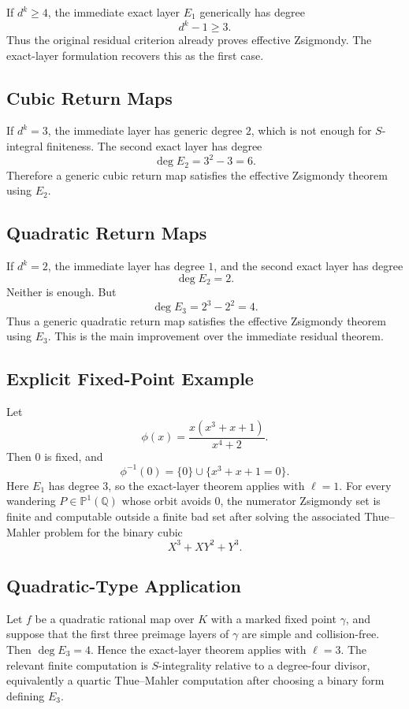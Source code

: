 \documentclass[11pt]{article}
\begin{document}
If \(d^k\ge4\), the immediate exact layer \(E_1\) generically has degree
\[
d^k-1\ge3.
\]
Thus the original residual criterion already proves effective Zsigmondy. The exact-layer formulation recovers this as the first case.

\subsection{Cubic Return Maps}

If \(d^k=3\), the immediate layer has generic degree \(2\), which is not enough for \(S\)-integral finiteness. The second exact layer has degree
\[
\deg E_2=3^2-3=6.
\]
Therefore a generic cubic return map satisfies the effective Zsigmondy theorem using \(E_2\).

\subsection{Quadratic Return Maps}

If \(d^k=2\), the immediate layer has degree \(1\), and the second exact layer has degree
\[
\deg E_2=2.
\]
Neither is enough. But
\[
\deg E_3=2^3-2^2=4.
\]
Thus a generic quadratic return map satisfies the effective Zsigmondy theorem using \(E_3\). This is the main improvement over the immediate residual theorem.

\subsection{Explicit Fixed-Point Example}

Let
\[
\phi(x)=\frac{x(x^3+x+1)}{x^4+2}.
\]
Then \(0\) is fixed, and
\[
\phi^{-1}(0)=\{0\}\cup\{x^3+x+1=0\}.
\]
Here \(E_1\) has degree \(3\), so the exact-layer theorem applies with \(\ell=1\). For every wandering \(P\in\mathbb P^1(\mathbb Q)\) whose orbit avoids \(0\), the numerator Zsigmondy set is finite and computable outside a finite bad set after solving the associated Thue--Mahler problem for the binary cubic
\[
X^3+XY^2+Y^3.
\]

\subsection{Quadratic-Type Application}

Let \(f\) be a quadratic rational map over \(K\) with a marked fixed point \(\gamma\), and suppose that the first three preimage layers of \(\gamma\) are simple and collision-free. Then \(\deg E_3=4\). Hence the exact-layer theorem applies with \(\ell=3\). The relevant finite computation is \(S\)-integrality relative to a degree-four divisor, equivalently a quartic Thue--Mahler computation after choosing a binary form defining \(E_3\).
\end{document}
